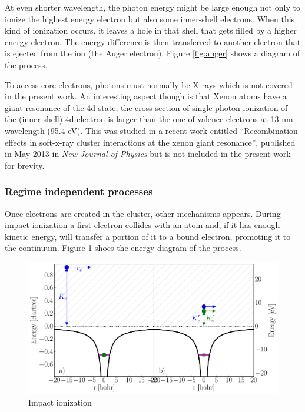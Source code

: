 \clearpage
{}

At even shorter wavelength, the photon energy might be large enough not only
to ionize the highest energy electron but also some inner-shell electrons. When
this kind of ionization occurs, it leaves a hole in that shell that gets filled
by a higher energy electron. The energy difference is then transferred to
another electron that is ejected from the ion (the Auger electron). Figure
\ref{fig:auger} shows a diagram of the process.


To access core electrons, photons must normally be X-rays which is not covered
in the present work. An interesting aspect though is that Xenon atoms have a
giant resonance of the 4d state; the cross-section of single photon ionization
of the (inner-shell) 4d electron is larger than the one of valence electrons at
13 nm wavelength (95.4 eV). This was studied in a recent work entitled
``Recombination effects in soft-x-ray cluster interactions at the xenon giant
resonance'', published in May 2013 in \textit{New Journal of
Physics}\cite{Ackad2013} but is not included in the present work for brevity.


\subsubsection{Regime independent processes}
\label{section:intro:mechanisms:noregime}

Once electrons are created in the cluster, other mechanisms appears. During
impact ionization a first electron collides with an atom and, if it has enough
kinetic energy, will transfer a portion of it to a bound electron, promoting it
to the continuum. Figure \ref{fig:ionization:impact} shoes the energy diagram
of the process.

\begin{figure}
 \centering
 \includegraphics[width=\figurewidth]{figures/ionization_impact}
 \caption{Impact ionization}
 \label{fig:ionization:impact}
\end{figure}


